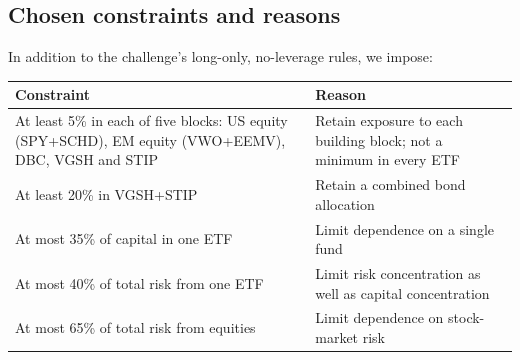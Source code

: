 \documentclass[10pt,a4paper]{article}
\begin{document}
\subsection{Chosen constraints and reasons}
In addition to the challenge's long-only, no-leverage rules, we impose:
\begin{center}
\begin{tabularx}{\linewidth}{@{}>{\raggedright\arraybackslash}p{.48\linewidth}>{\raggedright\arraybackslash}X@{}}
\toprule
Constraint & Reason \\
\midrule
At least 5\% in each of five blocks: US equity (SPY+SCHD), EM equity (VWO+EEMV), DBC, VGSH and STIP & Retain exposure to each building block; not a minimum in every ETF \\
At least 20\% in VGSH+STIP & Retain a combined bond allocation \\
At most 35\% of capital in one ETF & Limit dependence on a single fund \\
At most 40\% of total risk from one ETF & Limit risk concentration as well as capital concentration \\
At most 65\% of total risk from equities & Limit dependence on stock-market risk \\
\bottomrule
\end{tabularx}
\end{center}
\end{document}
